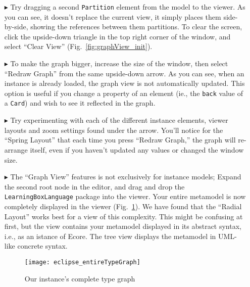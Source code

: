 \begin{itemize}
\item[$\blacktriangleright$] Try dragging a second \texttt{Partition} element from the model to the viewer. As you can see, it doesn't replace the current
view, it simply places them side-by-side, showing the references between them partitions. To clear the screen, click the upside-down triangle in the top
right corner of the window, and select ``Clear View'' (Fig.~\ref{fig:graphView_init}).

\item[$\blacktriangleright$] To make the graph bigger, increase the size of the window, then select ``Redraw Graph'' from the same upside-down arrow. As you can
see, when an instance is already loaded, the graph view is not automatically updated. This option is useful if you change a property of an element (ie., the
\texttt{back} value of a \texttt{Card}) and wish to see it reflected in the graph.

\item[$\blacktriangleright$] Try experimenting with each of the different instance elements, viewer layouts and zoom settings found under the arrow. You'll
notice for the ``Spring Layout'' that each time you press ``Redraw Graph,'' the graph will re-arrange itself, even if you haven't updated any values or changed the window size.

\item[$\blacktriangleright$] The ``Graph View'' features is not exclusively for instance models; Expand the second root node in the editor, and drag and
drop the \texttt{LearningBoxLanguage} package into the viewer. Your entire metamodel is now completely displayed in the viewer
(Fig.~\ref{fig:graphView_typeGraph}). We have found that the ``Radial Layout'' works best for a view of this complexity. This might be confusing at first, but
the view contains your metamodel displayed in its abstract syntax, i.e., as an istance of Ecore. The tree view displays the metamodel in UML-like concrete
syntax.

\vspace{1cm}

\begin{figure}[htbp]
	\centering
  \texttt{[image: eclipse\_entireTypeGraph]}
	\caption{Our instance's complete type graph}
	\label{fig:graphView_typeGraph}
\end{figure}


\end{itemize}
